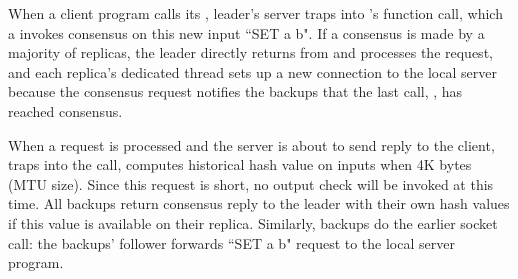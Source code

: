 When a client program calls its \send, leader's server traps into \xxx's \recv 
function call, which a invokes consensus on this new input ``SET a b". If 
a consensus is made by a majority of replicas, the leader directly returns from 
\recv and processes the request, and each replica's dedicated thread sets up 
a new connection to the local server because the \recv consensus request 
notifies the backups that the last call, \accept, has reached consensus.


When a request is processed and the server is about to send reply to the 
client, \xxx traps into the \send call, computes historical hash value on 
inputs when 4K bytes (MTU size). Since this request is short, no output check 
will be invoked at this time. All backups return consensus reply to the leader 
with their own hash values if this value is available on their replica. 
Similarly, backups do the earlier socket call: the backups' follower forwards 
``SET a b" request to the local server program.


